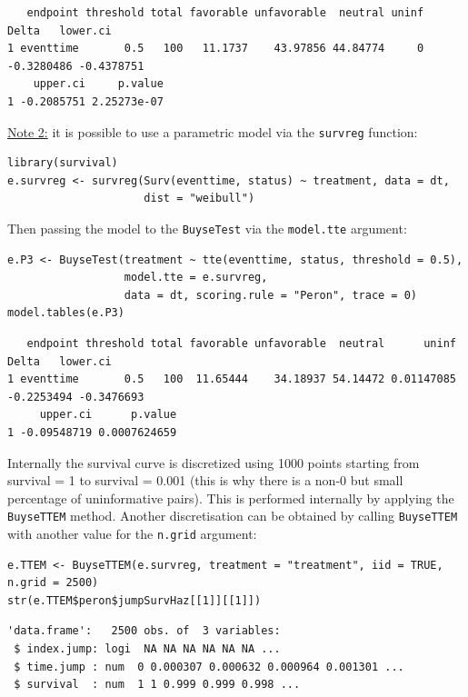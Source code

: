 \documentclass[12pt]{article}
\begin{document}
\begin{verbatim}
   endpoint threshold total favorable unfavorable  neutral uninf      Delta   lower.ci
1 eventtime       0.5   100   11.1737    43.97856 44.84774     0 -0.3280486 -0.4378751
    upper.ci     p.value
1 -0.2085751 2.25273e-07
\end{verbatim}


\bigskip

\uline{Note 2:} it is possible to use a parametric model via the \texttt{survreg} function:
\lstset{language=r,label= ,caption= ,captionpos=b,numbers=none}
\begin{lstlisting}
library(survival)
e.survreg <- survreg(Surv(eventtime, status) ~ treatment, data = dt, 
                     dist = "weibull")
\end{lstlisting}

Then passing the model to the \texttt{BuyseTest} via the \texttt{model.tte} argument:
\lstset{language=r,label= ,caption= ,captionpos=b,numbers=none}
\begin{lstlisting}
e.P3 <- BuyseTest(treatment ~ tte(eventtime, status, threshold = 0.5),
                  model.tte = e.survreg,
                  data = dt, scoring.rule = "Peron", trace = 0)
model.tables(e.P3)
\end{lstlisting}
\begin{verbatim}
   endpoint threshold total favorable unfavorable  neutral      uninf      Delta   lower.ci
1 eventtime       0.5   100  11.65444    34.18937 54.14472 0.01147085 -0.2253494 -0.3476693
     upper.ci      p.value
1 -0.09548719 0.0007624659
\end{verbatim}


Internally the survival curve is discretized using 1000 points
starting from survival = 1 to survival = 0.001 (this is why there is a
non-0 but small percentage of uninformative pairs). This is performed
internally by applying the \texttt{BuyseTTEM} method. Another discretisation
can be obtained by calling \texttt{BuyseTTEM} with another value for the \texttt{n.grid} argument:
\lstset{language=r,label= ,caption= ,captionpos=b,numbers=none}
\begin{lstlisting}
e.TTEM <- BuyseTTEM(e.survreg, treatment = "treatment", iid = TRUE, n.grid = 2500)
str(e.TTEM$peron$jumpSurvHaz[[1]][[1]])
\end{lstlisting}

\begin{verbatim}
'data.frame':	2500 obs. of  3 variables:
 $ index.jump: logi  NA NA NA NA NA NA ...
 $ time.jump : num  0 0.000307 0.000632 0.000964 0.001301 ...
 $ survival  : num  1 1 0.999 0.999 0.998 ...
\end{verbatim}
\end{document}
